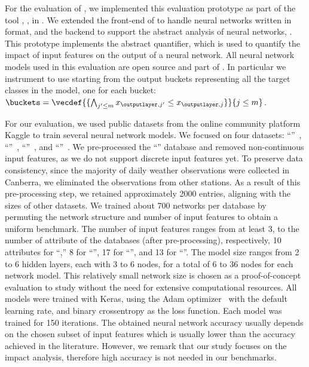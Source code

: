 For the evaluation of \changesname, we implemented this evaluation prototype as part of the tool \impatto,\sidenote{\impattourl} \cf{} , in \python{}.
We extended the front-end of \impatto{} to handle neural networks written in \python{} format, and the backend to support the abstract analysis of neural networks, \cf{} . This prototype implements the \abstractchangesname{} abstract quantifier, which is used to quantify the impact of input features on the output of a neural network. All neural network models used in this evaluation are open source and part of \impatto.
In particular we instrument \impatto{} to use \abstractchangesname{} starting from the output buckets representing all the target classes in the model, one for each bucket: $\buckets = \vecdef{\{\bigwedge_{j'\le m} x_{\outputlayer, j'}\le x_{\outputlayer, j}\}}{j\le m}$.


For our evaluation, we used public datasets from the online community platform Kaggle to train several neural network models.
We focused on four datasets: ``\wine''~, ``\diabetes''~, ``\rain''~, and ``\princess''~.
We pre-processed the ``\rain'' database and removed non-continuous input features, as we do not support discrete input features yet.
To preserve data consistency, since the majority of daily weather observations were collected in Canberra, we eliminated the observations from other stations.
As a result of this pre-processing step, we retained approximately 2000 entries, aligning with the sizes of other datasets.
We trained about 700 networks per database by permuting the network structure and number of input features to obtain a uniform benchmark.
The number of input features ranges from at least 3, to the number of attribute of the databases (after pre-processing),
respectively, 10 attributes for ``\wine,'' 8 for ``\diabetes'', 17 for ``\rain'', and 13 for ``\princess''.
The model size ranges from 2 to 6 hidden layers, each with 3 to 6 nodes, for a total of 6 to 36 nodes for each network model.
This relatively small network size is chosen as a proof-of-concept evaluation to study \changesname{} without the need for extensive computational resources.
All models were trained with Keras, using the Adam optimizer~ with the default learning rate, and binary crossentropy as the loss function. Each model was trained for 150 iterations.
The obtained neural network accuracy usually depends on the chosen subset of input features which is usually lower than the accuracy achieved in the literature.
However, we remark that our study focuses on the impact analysis, therefore high accuracy is not needed in our benchmarks.

